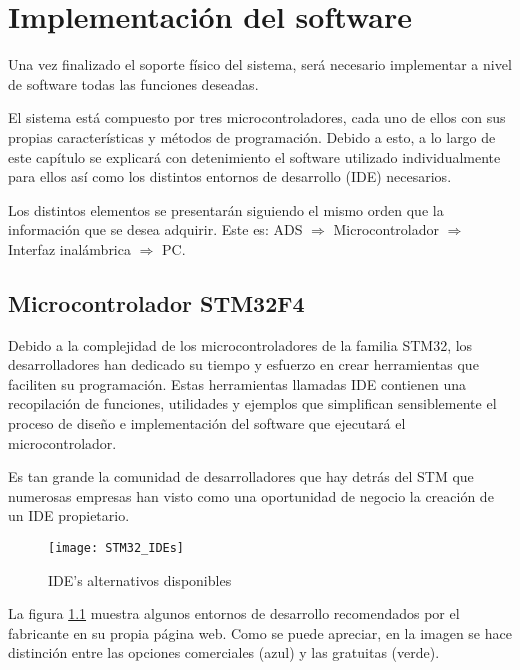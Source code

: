 \chapter{Implementación del software\label{sec:Implementacion_soft}}

Una vez finalizado el soporte físico del sistema, será necesario implementar a nivel de software todas las funciones deseadas.

El sistema está compuesto por tres microcontroladores, cada uno de ellos con sus propias características y métodos de programación. Debido a esto, a lo largo de este capítulo se explicará con detenimiento el software utilizado individualmente para ellos así como los distintos entornos de desarrollo (\acrshort{IDE}) necesarios.

Los distintos elementos se presentarán siguiendo el mismo orden que la información que se desea adquirir. Este es:
ADS $\Rightarrow$ Microcontrolador $\Rightarrow$ Interfaz inalámbrica $\Rightarrow$ PC.

\section{Microcontrolador STM32F4\label{Software_micro}}

Debido a la complejidad de los microcontroladores de la familia STM32, los desarrolladores han dedicado su tiempo y esfuerzo en crear herramientas que faciliten su programación. Estas herramientas llamadas \acrshort{IDE} contienen una recopilación de funciones, utilidades y ejemplos que simplifican sensiblemente el proceso de diseño e implementación del software que ejecutará el microcontrolador.

Es tan grande la comunidad de desarrolladores que hay detrás del STM que numerosas empresas han visto como una oportunidad de negocio la creación de un \acrshort{IDE} propietario.

\clearpage

\begin{figure} [h]
    \centering
    \texttt{[image: STM32\_IDEs]}
    \caption{IDE's alternativos disponibles \cite{STM32_IDEs}}
    \label{fig:STM32_IDEs}
\end{figure}

La figura \ref{fig:STM32_IDEs} muestra algunos entornos de desarrollo recomendados por el fabricante en su propia página web. Como se puede apreciar, en la imagen se hace distinción entre las opciones comerciales (azul) y las gratuitas (verde).

